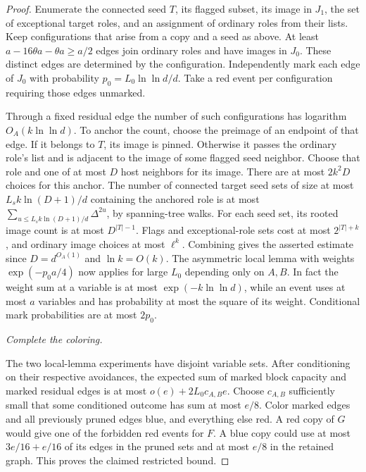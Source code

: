 \documentclass[11pt]{amsart}
\theoremstyle{definition}
\theoremstyle{remark}
\numberwithin{equation}{section}
\begin{document}
\begin{proof}
Enumerate the connected seed $T $, its flagged subset, its image in $ J_1$, the set of exceptional target roles, and an assignment of ordinary roles from their lists. Keep configurations that arise from a copy and a seed as above. At least $ a-16\theta a-\theta a\ge a/2$ edges join ordinary roles and have images in $ J_0$. These distinct edges are determined by the configuration. Independently mark each edge of $ J_0$ with probability $ p_0=L_0\ln\ln d/d$. Take a red event per configuration requiring those edges unmarked.

Through a fixed residual edge the number of such configurations has logarithm $O_A(k\ln\ln d)$. To anchor the count, choose the preimage of an endpoint of that edge. If it belongs to $ T $, its image is pinned. Otherwise it passes the ordinary role's list and is adjacent to the image of some flagged seed neighbor. Choose that role and one of at most $ D $ host neighbors for its image. There are at most $2k^2D $ choices for this anchor. The number of connected target seed sets of size at most $ L_sk\ln(D+1)/d $ containing the anchored role is at most $\sum_{u\le L_sk\ln(D+1)/d}\Delta^{2u}$, by spanning-tree walks. For each seed set, its rooted image count is at most $ D^{|T|-1}$. Flags and exceptional-role sets cost at most $2^{|T|+k}$, and ordinary image choices at most $\ell^k $. Combining gives the asserted estimate since $ D=d^{O_A(1)}$ and $\ln k=O(k)$. The asymmetric local lemma with weights $\exp(-p_0 a/4)$ now applies for large $ L_0$ depending only on $ A,B $. In fact the weight sum at a variable is at most $\exp(-k\ln\ln d)$, while an event uses at most $ a $ variables and has probability at most the square of its weight. Conditional mark probabilities are at most $2p_0$.

\medskip\noindent\emph{Complete the coloring.}

The two local-lemma experiments have disjoint variable sets. After conditioning on their respective avoidances, the expected sum of marked block capacity and marked residual edges is at most $o(e)+2L_0 c_{A,B}e $. Choose $ c_{A,B}$ sufficiently small that some conditioned outcome has sum at most $ e/8$. Color marked edges and all previously pruned edges blue, and everything else red. A red copy of $ G $ would give one of the forbidden red events for $ F $. A blue copy could use at most $3e/16+e/16$ of its edges in the pruned sets and at most $ e/8$ in the retained graph. This proves the claimed restricted bound.

\end{proof}
\end{document}
